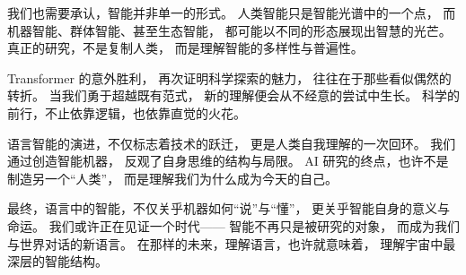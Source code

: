 我们也需要承认，智能并非单一的形式。  
人类智能只是智能光谱中的一个点，  
而机器智能、群体智能、甚至生态智能，  
都可能以不同的形态展现出智慧的光芒。  
真正的研究，不是复制人类，  
而是理解智能的多样性与普遍性。  

Transformer 的意外胜利，  
再次证明科学探索的魅力，  
往往在于那些看似偶然的转折。  
当我们勇于超越既有范式，  
新的理解便会从不经意的尝试中生长。  
科学的前行，不止依靠逻辑，也依靠直觉的火花。  

语言智能的演进，不仅标志着技术的跃迁，  
更是人类自我理解的一次回环。  
我们通过创造智能机器，  
反观了自身思维的结构与局限。  
AI 研究的终点，也许不是制造另一个“人类”，  
而是理解我们为什么成为今天的自己。  

最终，语言中的智能，不仅关乎机器如何“说”与“懂”，  
更关乎智能自身的意义与命运。  
我们或许正在见证一个时代——  
智能不再只是被研究的对象，  
而成为我们与世界对话的新语言。  
在那样的未来，理解语言，也许就意味着，  
理解宇宙中最深层的智能结构。  

